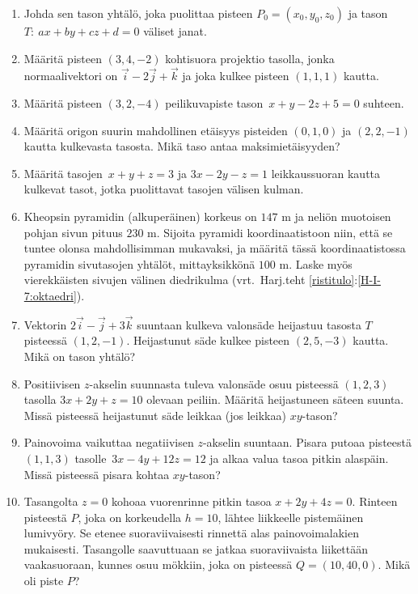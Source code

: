 \begin{enumerate}
\item
Johda sen tason yhtälö, joka puolittaa pisteen $P_0=(x_0,y_0,z_0)$ ja tason $T:\ ax+by+cz+d=0$
väliset janat.

\item
Määritä pisteen $(3,4,-2)$ kohtisuora projektio tasolla, jonka normaalivektori on
$\vec i-2\vec j+\vec k$ ja joka kulkee pisteen $(1,1,1)$ kautta.

\item
Määritä pisteen $(3,2,-4)$ peilikuvapiste tason $\,x+y-2z+5=0$ suhteen.

\item 
Määritä origon suurin mahdollinen etäisyys pisteiden $(0,1,0)$ ja $(2,2,-1)$ kautta
kulkevasta tasosta. Mikä taso antaa maksimietäisyyden?

\item
Määritä tasojen $\,x+y+z=3$ ja $3x-2y-z=1$ leikkaussuoran kautta kulkevat tasot, jotka
puolittavat tasojen välisen kulman.

\item
Kheopsin pyramidin (alkuperäinen) korkeus on $147$ m ja neliön muotoisen 
poh\-jan sivun pituus $230$ m. Sijoita pyramidi koordinaatistoon niin, että se
tuntee olonsa mahdollisimman mukavaksi, ja määritä tässä koordinaatistossa pyramidin
sivutasojen yhtälöt, mittayksikkönä $100$ m. Laske myös vierekkäisten sivujen välinen 
diedrikulma (vrt.\ Harj.teht \ref{ristitulo}:\ref{H-I-7:oktaedri}).

\item
Vektorin $2\vec i-\vec j+3\vec k$ suuntaan kulkeva valonsäde heijastuu tasosta $T$ pisteessä
$(1,2,-1)$. Heijastunut säde kulkee pisteen $(2,5,-3)$ kautta. Mikä on tason yhtälö?

\item
Positiivisen $z$-akselin suunnasta tuleva valonsäde osuu pisteessä $(1,2,3)$ tasolla
$3x+2y+z=10$ olevaan peiliin. Määritä heijastuneen säteen suunta. Missä pisteessä heijastunut
säde leikkaa (jos leikkaa) $xy$-tason?

\item
Painovoima vaikuttaa negatiivisen $z$-akselin suuntaan. Pisara putoaa pisteestä $(1,1,3)$ 
tasolle $\,3x-4y+12z=12$ ja alkaa valua tasoa pitkin alaspäin. Missä pisteessä pisara kohtaa
$xy$-tason?

\item
Tasangolta $z=0$ kohoaa vuorenrinne pitkin tasoa $x+2y+4z=0$. Rinteen pisteestä $P$, joka on 
korkeudella $h=10$, lähtee liikkeelle pistemäinen lumivyöry. Se etenee suoraviivaisesti 
rinnettä alas painovoimalakien mukaisesti. Tasangolle saavuttuaan se jatkaa suoraviivaista
liikettään vaakasuoraan, kunnes osuu mökkiin, joka on pisteessä $Q=(10,40,0)$.
Mikä oli piste $P$?


\end{enumerate}

